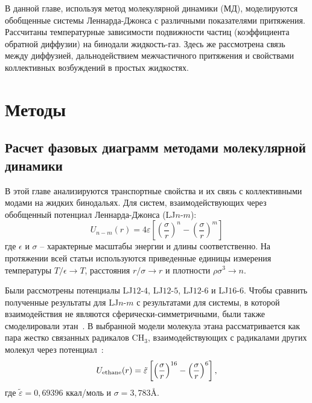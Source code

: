 В данной главе, используя метод молекулярной динамики (МД), моделируются обобщенные системы Леннарда-Джонса с различными показателями притяжения.
Рассчитаны температурные зависимости подвижности частиц (коэффициента обратной диффузии) на бинодали жидкость-газ. 
Здесь же рассмотрена связь между диффузией, дальнодействием межчастичного притяжения и свойствами коллективных возбуждений в простых жидкостях.

\section{Методы}
\label{MACR-SecMethods}

\subsection{Расчет фазовых диаграмм методами молекулярной динамики}
\label{MACR-SubSecMD}

В этой главе анализируются транспортные свойства и их связь с коллективными модами на жидких бинодальях.
Для систем, взаимодействующих через обобщенный потенциал Леннарда-Джонса (LJ$n$-$m$):
\begin{equation}
  U_{n-m}(r)=4 \varepsilon\left[\left(\frac{\sigma}{r}\right)^{n}-\left(\frac{\sigma}{r}\right)^{m}\right]
  \label{MACR-eq1}
\end{equation}
где $\epsilon$ и $\sigma$ -- характерные масштабы энергии и длины соответственно.
На протяжении всей статьи используются приведенные единицы измерения температуры $ T/ \epsilon \rightarrow T $, расстояния $ r/ \sigma \rightarrow r $ и плотности $ \rho \sigma ^ 3 \rightarrow n$.


Были рассмотрены потенциалы LJ$12$-$4$, LJ$12$-$5$, LJ$12$-$6$ и LJ$16$-$6$.
Чтобы сравнить полученные результаты для LJ$n$-$m$ с результатами для системы, в которой взаимодействия не являются сферически-симметричными, были также смоделировали этан~\cite{10.1021/acs.jced.6b01036}.
В выбранной модели молекула этана рассматривается как пара жестко связанных радикалов CH$_3$, взаимодействующих с радикалами других молекул через потенциал~\cite{10.1021/acs.jced.6b01036}:
\begin{equation}
  U_{\rm {ethane}}(r) = \tilde \varepsilon\left[\left(\frac{\sigma}{r}\right)^{16}-\left(\frac{\sigma}{r}\right)^{6}\right],
  \label{MACR-eq2}
\end{equation}
где $\tilde\varepsilon = 0,69396$ ккал/моль и $\sigma = 3,783$\AA.

